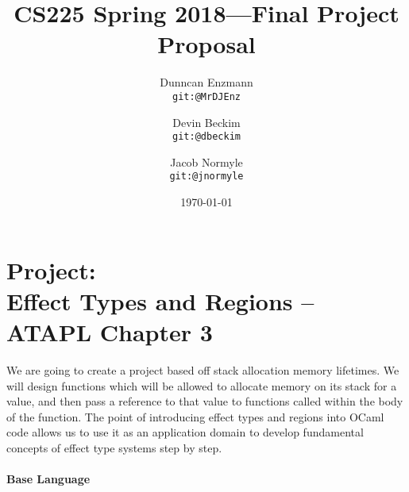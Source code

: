 \documentclass{article}
\title{CS225 Spring 2018---Final Project Proposal}
\author{
  Dunncan Enzmann \\ \small{\texttt{git:@MrDJEnz}}
  \and Devin Beckim \\ \small{\texttt{git:@dbeckim}}
  \and Jacob Normyle \\ \small{\texttt{git:@jnormyle}}
}
\date{\today}
\begin{document}
\maketitle

\section*{Project: \\Effect Types and Regions --  ATAPL Chapter 3}

We are going to create a project based off stack allocation memory lifetimes. We will design functions which will be allowed to allocate memory on its stack for a value, and then pass a reference to that value to functions called within the body of the function. The point of introducing effect types and regions into OCaml code allows us to use it as an application domain to develop fundamental concepts of effect type systems step by step.

\paragraph{Base Language}
\end{document}

